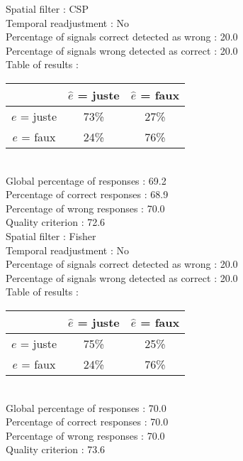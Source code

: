 Spatial filter : CSP \\
Temporal readjustment : No \\
Percentage of signals correct detected as wrong :   20.0 \\
Percentage of signals wrong detected as correct :   20.0 \\
Table of results : \\
\begin{tabular}{|c|c|c|}
\hline				& $\hat{e}$ = juste & $\hat{e}$ = faux \\
\hline  $e$ = juste	&     73\%			&     27\%		\\
\hline  $e$ = faux	&     24\%			&     76\%		\\
\hline
\end{tabular}\\
Global percentage of responses :   69.2 \\
Percentage of correct responses :   68.9 \\
Percentage of wrong responses :   70.0 \\
Quality criterion :   72.6 \\

Spatial filter : Fisher \\
Temporal readjustment : No \\
Percentage of signals correct detected as wrong :   20.0 \\
Percentage of signals wrong detected as correct :   20.0 \\
Table of results : \\
\begin{tabular}{|c|c|c|}
\hline				& $\hat{e}$ = juste & $\hat{e}$ = faux \\
\hline  $e$ = juste	&     75\%			&     25\%		\\
\hline  $e$ = faux	&     24\%			&     76\%		\\
\hline
\end{tabular}\\
Global percentage of responses :   70.0 \\
Percentage of correct responses :   70.0 \\
Percentage of wrong responses :   70.0 \\
Quality criterion :   73.6 \\

